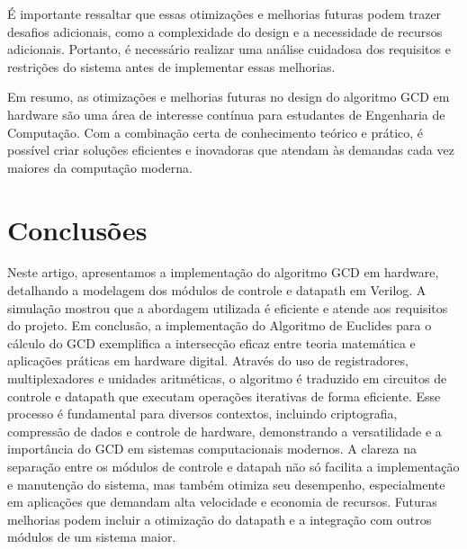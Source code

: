 \documentclass[a4paper,11pt]{article} %
\begin{document}
É importante ressaltar que essas otimizações e melhorias futuras podem trazer desafios adicionais, como a complexidade do design e a necessidade de recursos adicionais. Portanto, é necessário realizar uma análise cuidadosa dos requisitos e restrições do sistema antes de implementar essas melhorias.


Em resumo, as otimizações e melhorias futuras no design do algoritmo GCD em hardware são uma área de interesse contínua para estudantes de Engenharia de Computação. Com a combinação certa de conhecimento teórico e prático, é possível criar soluções eficientes e inovadoras que atendam às demandas cada vez maiores da computação moderna.


\section{Conclusões}

Neste artigo, apresentamos a implementação do algoritmo GCD em hardware, detalhando a modelagem dos módulos de controle e datapath em Verilog. A simulação mostrou que a abordagem utilizada é eficiente e atende aos requisitos do projeto. Em conclusão, a implementação do Algoritmo de Euclides para o cálculo do GCD exemplifica a intersecção eficaz entre teoria matemática e aplicações práticas em hardware digital. Através do uso de registradores, multiplexadores e unidades aritméticas, o algoritmo é traduzido em circuitos de controle e datapath que executam operações iterativas de forma eficiente.
Esse processo é fundamental para diversos contextos, incluindo criptografia, compressão de dados e controle de hardware, demonstrando a versatilidade e a importância do GCD em sistemas computacionais modernos. A clareza na separação entre os módulos de controle e datapah não só facilita a implementação e manutenção do sistema, mas também otimiza seu desempenho, especialmente em aplicações que demandam alta velocidade e economia de recursos. Futuras melhorias podem incluir a otimização do datapath e a integração com outros módulos de um sistema maior.


\end{document}
